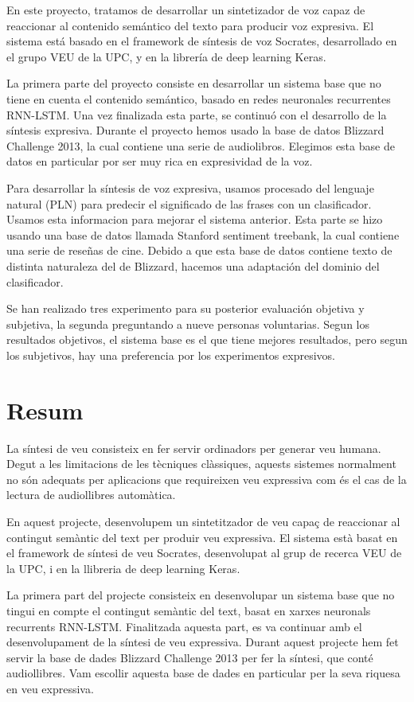 En este proyecto, tratamos de desarrollar un sintetizador de voz capaz de reaccionar al contenido semántico del texto para producir voz expresiva. El sistema está basado en el framework de síntesis de voz Socrates, desarrollado en el grupo VEU de la UPC, y en la librería de deep learning Keras.

La primera parte del proyecto consiste en desarrollar un sistema base que no tiene en cuenta el contenido semántico, basado en redes neuronales recurrentes RNN-LSTM. Una vez finalizada esta parte, se continuó con el desarrollo de la síntesis expresiva. Durante el proyecto hemos usado la base de datos Blizzard Challenge 2013, la cual contiene una serie de audiolibros. Elegimos esta base de datos en particular por ser muy rica en expresividad de la voz.

Para desarrollar la síntesis de voz expresiva, usamos procesado del lenguaje natural (PLN) para predecir el significado de las frases con un clasificador. Usamos esta informacion para mejorar el sistema anterior. Esta parte se hizo usando una base de datos llamada Stanford sentiment treebank, la cual contiene una serie de reseñas de cine. Debido a que esta base de datos contiene texto de distinta naturaleza del de Blizzard, hacemos una adaptación del dominio del clasificador.

Se han realizado tres experimento para su posterior evaluación objetiva y subjetiva, la segunda preguntando a nueve personas voluntarias. Segun los resultados objetivos, el sistema base es el que tiene mejores resultados, pero segun los subjetivos, hay una preferencia por los experimentos expresivos.

\chapter*{Resum}

La síntesi de veu consisteix en fer servir ordinadors per generar veu humana. Degut a les limitacions de les tècniques clàssiques, aquests sistemes normalment no són adequats per aplicacions que requireixen veu expressiva com és el cas de la lectura de audiollibres automàtica.

En aquest projecte, desenvolupem un sintetitzador de veu capaç de reaccionar al contingut semàntic del text per produir veu expressiva. El sistema està basat en el framework de síntesi de veu Socrates, desenvolupat al grup de recerca VEU de la UPC, i en la llibreria de deep learning Keras.

La primera part del projecte consisteix en desenvolupar un sistema base que no tingui en compte el contingut semàntic del text, basat en xarxes neuronals recurrents RNN-LSTM. Finalitzada aquesta part, es va continuar amb el desenvolupament de la síntesi de veu expressiva. Durant aquest projecte hem fet servir la base de dades Blizzard Challenge 2013 per fer la síntesi, que conté audiollibres. Vam escollir aquesta base de dades en particular per la seva riquesa en veu expressiva.

